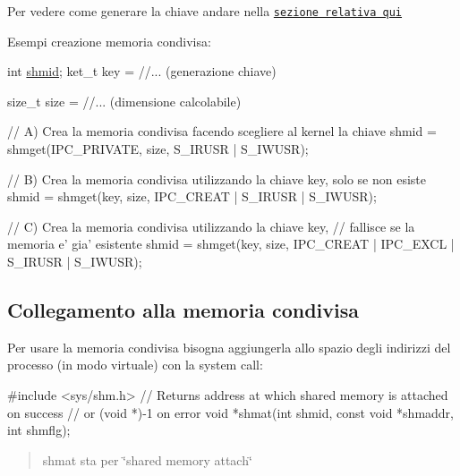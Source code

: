 Per vedere come generare la chiave andare nella \href{md_theory_generate_keys_generate_keys.html}{\tt sezione relativa qui}

Esempi creazione memoria condivisa\+: 
\begin{DoxyCode}
\textcolor{keywordtype}{int} \hyperlink{client_8c_ac8807d215d2ee6d9779d76aeb1147430}{shmid};
ket\_t key = \textcolor{comment}{//... (generazione chiave)}

\textcolor{keywordtype}{size\_t} size = \textcolor{comment}{//... (dimensione calcolabile)}

\textcolor{comment}{// A) Crea la memoria condivisa facendo scegliere al kernel la chiave}
shmid = shmget(IPC\_PRIVATE, size, S\_IRUSR | S\_IWUSR);

\textcolor{comment}{// B) Crea la memoria condivisa utilizzando la chiave key, solo se non esiste}
shmid = shmget(key, size, IPC\_CREAT | S\_IRUSR | S\_IWUSR);

\textcolor{comment}{// C) Crea la memoria condivisa utilizzando la chiave key,}
\textcolor{comment}{//    fallisce se la memoria e' gia' esistente}
shmid = shmget(key, size, IPC\_CREAT | IPC\_EXCL | S\_IRUSR | S\_IWUSR);
\end{DoxyCode}


\subsection*{Collegamento alla memoria condivisa}

Per usare la memoria condivisa bisogna aggiungerla allo spazio degli indirizzi del processo (in modo virtuale) con la system call\+:


\begin{DoxyCode}
\textcolor{preprocessor}{#include <sys/shm.h>}
\textcolor{comment}{// Returns address at which shared memory is attached on success}
\textcolor{comment}{// or (void *)-1 on error}
\textcolor{keywordtype}{void} *shmat(\textcolor{keywordtype}{int} shmid, \textcolor{keyword}{const} \textcolor{keywordtype}{void} *shmaddr, \textcolor{keywordtype}{int} shmflg);
\end{DoxyCode}
 \begin{quote}
shmat sta per \char`\"{}shared memory attach\char`\"{} \end{quote}



